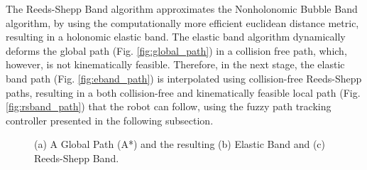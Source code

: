 \documentclass[conference]{IEEEtran}
\begin{document}

The Reeds-Shepp Band algorithm approximates the Nonholonomic Bubble Band algorithm, by using the computationally more efficient euclidean distance metric, resulting in a holonomic elastic band. The elastic band \cite{eband} algorithm dynamically deforms the global path (Fig. \ref{fig:global_path}) in a collision free path, which, however, is not kinematically feasible. Therefore, in the next stage, the elastic band path (Fig. \ref{fig:eband_path}) is interpolated using collision-free Reeds-Shepp paths, resulting in a both collision-free and kinematically feasible local path (Fig. \ref{fig:rsband_path}) that the robot can follow, using the fuzzy path tracking controller presented in the following subsection.

\begin{figure}[!ht]
	\centering
	\hspace{0.05cm}
	\hspace{0.05cm}
	\caption{(a) A Global Path (A*) and the resulting (b) Elastic Band and (c) Reeds-Shepp Band.}
\end{figure}
\end{document}
